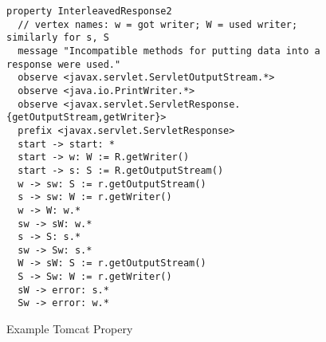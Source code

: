 \documentclass[9pt, preprint]{sigplanconf} %
\theoremstyle{definition}
\theoremstyle{remark}
\begin{document}
\begin{figure*}[h]\label{fig:tomcat-prop}
\begin{Verbatim}
property InterleavedResponse2
  // vertex names: w = got writer; W = used writer; similarly for s, S
  message "Incompatible methods for putting data into a response were used."
  observe <javax.servlet.ServletOutputStream.*>
  observe <java.io.PrintWriter.*>
  observe <javax.servlet.ServletResponse.{getOutputStream,getWriter}>
  prefix <javax.servlet.ServletResponse>
  start -> start: *
  start -> w: W := R.getWriter()
  start -> s: S := R.getOutputStream()
  w -> sw: S := r.getOutputStream()
  s -> sw: W := r.getWriter()
  w -> W: w.*
  sw -> sW: w.*
  s -> S: s.*
  sw -> Sw: s.*
  W -> sW: S := r.getOutputStream()
  S -> Sw: W := r.getWriter()
  sW -> error: s.*
  Sw -> error: w.*
\end{Verbatim}
\caption{Example Tomcat Propery}
\end{figure*}

\end{document}
